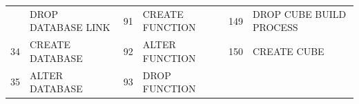\begin{appendix}
\begin{longtable}[]{@{}rl|rl|rl@{}}
\begin{minipage}[t]{0.06\columnwidth}
\end{minipage} & \begin{minipage}[t]{0.19\columnwidth}\raggedright\strut
DROP DATABASE LINK\strut
\end{minipage} & \begin{minipage}[t]{0.06\columnwidth}\raggedright\strut
91\strut
\end{minipage} & \begin{minipage}[t]{0.24\columnwidth}\raggedright\strut
CREATE FUNCTION\strut
\end{minipage} & \begin{minipage}[t]{0.06\columnwidth}\raggedright\strut
149\strut
\end{minipage} & \begin{minipage}[t]{0.24\columnwidth}\raggedright\strut
DROP CUBE BUILD PROCESS\strut
\end{minipage}\tabularnewline
\begin{minipage}[t]{0.06\columnwidth}\raggedright\strut
34\strut
\end{minipage} & \begin{minipage}[t]{0.19\columnwidth}\raggedright\strut
CREATE DATABASE\strut
\end{minipage} & \begin{minipage}[t]{0.06\columnwidth}\raggedright\strut
92\strut
\end{minipage} & \begin{minipage}[t]{0.24\columnwidth}\raggedright\strut
ALTER FUNCTION\strut
\end{minipage} & \begin{minipage}[t]{0.06\columnwidth}\raggedright\strut
150\strut
\end{minipage} & \begin{minipage}[t]{0.24\columnwidth}\raggedright\strut
CREATE CUBE\strut
\end{minipage}\tabularnewline
\begin{minipage}[t]{0.06\columnwidth}\raggedright\strut
35\strut
\end{minipage} & \begin{minipage}[t]{0.19\columnwidth}\raggedright\strut
ALTER DATABASE\strut
\end{minipage} & \begin{minipage}[t]{0.06\columnwidth}\raggedright\strut
93\strut
\end{minipage} & \begin{minipage}[t]{0.24\columnwidth}\raggedright\strut
DROP FUNCTION\strut
\end{minipage} & \begin{minipage}[t]{0.06\columnwidth}\raggedright\strut

\end{minipage}
\end{longtable}
\end{appendix}
